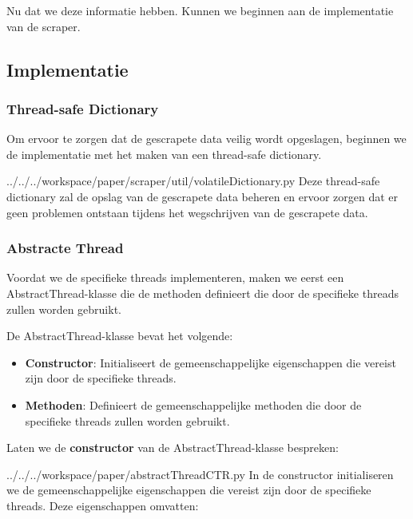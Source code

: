 Nu dat we deze informatie hebben. Kunnen we beginnen aan de implementatie van de scraper. 

\subsection{Implementatie}
\subsubsection{Thread-safe Dictionary}
Om ervoor te zorgen dat de gescrapete data veilig wordt opgeslagen, beginnen we de implementatie met het maken van een thread-safe dictionary.
\begin{pythoncode}{../../../workspace/paper/scraper/util/volatileDictionary.py}
Deze thread-safe dictionary zal de opslag van de gescrapete data beheren en ervoor zorgen dat er geen problemen ontstaan tijdens het wegschrijven van de gescrapete data.
\end{pythoncode}

\subsubsection{Abstracte Thread}
Voordat we de specifieke threads implementeren, maken we eerst een AbstractThread-klasse die de methoden definieert die door de specifieke threads zullen worden gebruikt.

De AbstractThread-klasse bevat het volgende:

\begin{itemize}
    \item \textbf{Constructor}: Initialiseert de gemeenschappelijke eigenschappen die vereist zijn door de specifieke threads.
    \item \textbf{Methoden}: Definieert de gemeenschappelijke methoden die door de specifieke threads zullen worden gebruikt.
\end{itemize}

Laten we de \textbf{constructor} van de AbstractThread-klasse bespreken:

\begin{pythoncode}{../../../workspace/paper/abstractThreadCTR.py}
    In de constructor initialiseren we de gemeenschappelijke eigenschappen die vereist zijn door de specifieke threads. Deze eigenschappen omvatten:
\end{pythoncode}


